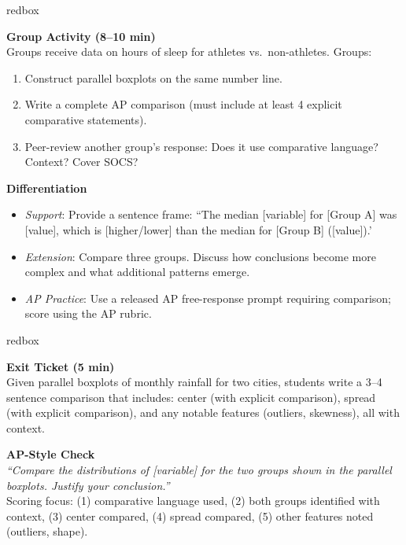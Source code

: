 \documentclass[10pt]{article}
\begin{document}
\begin{skillbox}{redbox}
\begin{minipage}[t]{0.48\linewidth}
    \textbf{Group Activity (8--10 min)}\\
    Groups receive data on hours of sleep for athletes vs.\ non-athletes. Groups:
    \begin{enumerate}
        \item Construct parallel boxplots on the same number line.
        \item Write a complete AP comparison (must include at least 4 explicit comparative statements).
        \item Peer-review another group's response: Does it use comparative language? Context? Cover SOCS?
    \end{enumerate}
\end{minipage}
\hfill
\begin{minipage}[t]{0.48\linewidth}
    \textbf{Differentiation}
    \begin{itemize}
        \item \textit{Support}: Provide a sentence frame: ``The median [variable] for [Group A] was [value], which is [higher/lower] than the median for [Group B] ([value]).'
        \item \textit{Extension}: Compare three groups. Discuss how conclusions become more complex and what additional patterns emerge.
        \item \textit{AP Practice}: Use a released AP free-response prompt requiring comparison; score using the AP rubric.
    \end{itemize}
\end{minipage}
\end{skillbox}

\begin{skillbox}{redbox}
\begin{minipage}[t]{0.48\linewidth}
    \textbf{Exit Ticket (5 min)}\\
    Given parallel boxplots of monthly rainfall for two cities, students write a 3--4 sentence comparison that includes: center (with explicit comparison), spread (with explicit comparison), and any notable features (outliers, skewness), all with context.
\end{minipage}
\hfill
\begin{minipage}[t]{0.48\linewidth}
    \textbf{AP-Style Check}\\
    \textit{``Compare the distributions of [variable] for the two groups shown in the parallel boxplots. Justify your conclusion.''}\\[4pt]
    Scoring focus: (1) comparative language used, (2) both groups identified with context, (3) center compared, (4) spread compared, (5) other features noted (outliers, shape).
\end{minipage}
\end{skillbox}
\end{document}
